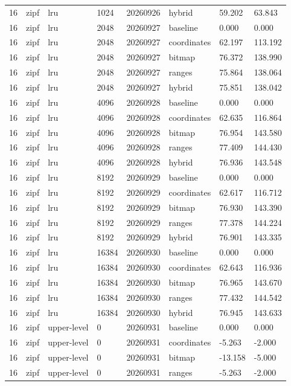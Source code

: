 \begin{tabular}{llllllll}
16 & zipf & lru & 1024 & 20260926 & hybrid & 59.202 & 63.843 \\
16 & zipf & lru & 2048 & 20260927 & baseline & 0.000 & 0.000 \\
16 & zipf & lru & 2048 & 20260927 & coordinates & 62.197 & 113.192 \\
16 & zipf & lru & 2048 & 20260927 & bitmap & 76.372 & 138.990 \\
16 & zipf & lru & 2048 & 20260927 & ranges & 75.864 & 138.064 \\
16 & zipf & lru & 2048 & 20260927 & hybrid & 75.851 & 138.042 \\
16 & zipf & lru & 4096 & 20260928 & baseline & 0.000 & 0.000 \\
16 & zipf & lru & 4096 & 20260928 & coordinates & 62.635 & 116.864 \\
16 & zipf & lru & 4096 & 20260928 & bitmap & 76.954 & 143.580 \\
16 & zipf & lru & 4096 & 20260928 & ranges & 77.409 & 144.430 \\
16 & zipf & lru & 4096 & 20260928 & hybrid & 76.936 & 143.548 \\
16 & zipf & lru & 8192 & 20260929 & baseline & 0.000 & 0.000 \\
16 & zipf & lru & 8192 & 20260929 & coordinates & 62.617 & 116.712 \\
16 & zipf & lru & 8192 & 20260929 & bitmap & 76.930 & 143.390 \\
16 & zipf & lru & 8192 & 20260929 & ranges & 77.378 & 144.224 \\
16 & zipf & lru & 8192 & 20260929 & hybrid & 76.901 & 143.335 \\
16 & zipf & lru & 16384 & 20260930 & baseline & 0.000 & 0.000 \\
16 & zipf & lru & 16384 & 20260930 & coordinates & 62.643 & 116.936 \\
16 & zipf & lru & 16384 & 20260930 & bitmap & 76.965 & 143.670 \\
16 & zipf & lru & 16384 & 20260930 & ranges & 77.432 & 144.542 \\
16 & zipf & lru & 16384 & 20260930 & hybrid & 76.945 & 143.633 \\
16 & zipf & upper-level & 0 & 20260931 & baseline & 0.000 & 0.000 \\
16 & zipf & upper-level & 0 & 20260931 & coordinates & -5.263 & -2.000 \\
16 & zipf & upper-level & 0 & 20260931 & bitmap & -13.158 & -5.000 \\
16 & zipf & upper-level & 0 & 20260931 & ranges & -5.263 & -2.000 \\

\end{tabular}
